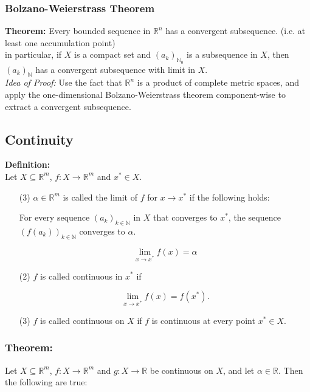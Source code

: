 \documentclass{article}
\begin{document}
\subsubsection{Bolzano-Weierstrass Theorem}
\textbf{Theorem:} Every bounded sequence in $\mathbb{R}^n$ has a convergent subsequence. (i.e. at least one accumulation point) \\
in particular, if $X$ is a compact set and  $(a_k)_{\mathbb{N}_{0}}$ is a subsequence in $X$, then  $(a_k)_{\mathbb{N}}$ has a convergent subsequence with limit in $X$.
\\ 
\textit{Idea of Proof:} Use the fact that $\mathbb{R}^n$ is a product of complete metric spaces, and apply the one-dimensional Bolzano-Weierstrass theorem component-wise to extract a convergent subsequence.
\vspace{10mm}
\subsection{Continuity}

\textbf{Definition:}\\
Let \( X \subseteq \mathbb{R}^m \), \( f: X \rightarrow \mathbb{R}^m \) and \( x^* \in X \).

\begin{enumerate}
    \item[(3)] \(\alpha \in \mathbb{R}^m\) is called the limit of \( f \) for \( x \rightarrow x^* \) if the following holds:
    
    For every sequence \((a_k)_{k \in \mathbb{N}}\) in \( X \) that converges to \( x^* \), the sequence \((f(a_k))_{k \in \mathbb{N}}\) converges to \(\alpha\).
    
    \[
    \lim_{x \rightarrow x^*} f(x) = \alpha
    \]
    
    \item[(2)] \( f \) is called continuous in \( x^* \) if 
    
    \[
    \lim_{x \rightarrow x^*} f(x) = f(x^*).
    \]
    
    \item[(3)] \( f \) is called continuous on \( X \) if \( f \) is continuous at every point \( x^* \in X \).
\end{enumerate}

\subsubsection{Theorem:}
Let \( X \subseteq \mathbb{R}^m \), \( f: X \rightarrow \mathbb{R}^m \) and \( g: X \rightarrow \mathbb{R} \) be continuous on \( X \), and let \( \alpha \in \mathbb{R} \). Then the following are true:
\end{document}
